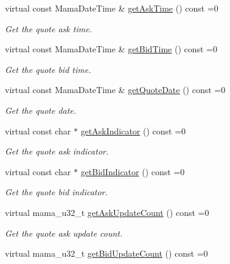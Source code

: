 \begin{CompactItemize}
virtual const Mama\-Date\-Time \& \hyperlink{classWombat_1_1MamdaQuoteUpdate_bbf950fb656b806a598e188716005809}{get\-Ask\-Time} () const =0
\begin{CompactList}\small\item\em Get the quote ask time. \item\end{CompactList}\item 
virtual const Mama\-Date\-Time \& \hyperlink{classWombat_1_1MamdaQuoteUpdate_f98eda88e24a04ab8d74b8725a4f5265}{get\-Bid\-Time} () const =0
\begin{CompactList}\small\item\em Get the quote bid time. \item\end{CompactList}\item 
virtual const Mama\-Date\-Time \& \hyperlink{classWombat_1_1MamdaQuoteUpdate_d02f980bc64ca03a40fa5df13acf43d3}{get\-Quote\-Date} () const =0
\begin{CompactList}\small\item\em Get the quote date. \item\end{CompactList}\item 
virtual const char $\ast$ \hyperlink{classWombat_1_1MamdaQuoteUpdate_d4aef78f84d2c31db345e147fcf6ca4c}{get\-Ask\-Indicator} () const =0
\begin{CompactList}\small\item\em Get the quote ask indicator. \item\end{CompactList}\item 
virtual const char $\ast$ \hyperlink{classWombat_1_1MamdaQuoteUpdate_51cc4027f5eecfa772ae6535ccf6d0d9}{get\-Bid\-Indicator} () const =0
\begin{CompactList}\small\item\em Get the quote bid indicator. \item\end{CompactList}\item 
virtual mama\_\-u32\_\-t \hyperlink{classWombat_1_1MamdaQuoteUpdate_b204ad341a16a3da86e970b62bb41147}{get\-Ask\-Update\-Count} () const =0
\begin{CompactList}\small\item\em Get the quote ask update count. \item\end{CompactList}\item 
virtual mama\_\-u32\_\-t \hyperlink{classWombat_1_1MamdaQuoteUpdate_579b4cc8bbff1cfd86af8c382df937d1}{get\-Bid\-Update\-Count} () const =0

\end{CompactItemize}
